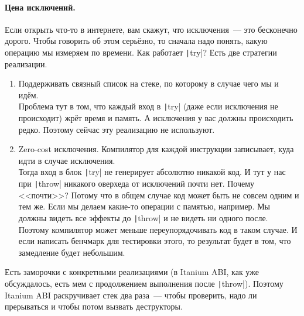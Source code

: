 \documentclass{article}
\begin{document}
    \paragraph{Цена исключений.}
    Если открыть что-то в интернете, вам скажут, что исключения~--- это бесконечно дорого. Чтобы говорить об этом серьёзно, то сначала надо понять, какую операцию мы измеряем по времени. Как работает \texttt|try|? Есть две стратегии реализации.
    \begin{enumerate}
        \item Поддерживать связный список на стеке, по которому в случае чего мы и идём.\\
        Проблема тут в том, что каждый вход в \texttt|try| (даже если исключения не происходит) жрёт время и память. А исключения у вас должны происходить редко. Поэтому сейчас эту реализацию не используют.
        \item Zero-cost исключения. Компилятор для каждой инструкции записывает, куда идти в случае исключения.\\
        Тогда вход в блок \texttt|try| не генерирует абсолютно никакой код. И тут у нас при \texttt|throw| никакого оверхеда от исключений почти нет. Почему <<почти>>? Потому что в общем случае код может быть не совсем одним и тем же. Если мы делаем какие-то операции с памятью, например. Мы должны видеть все эффекты до \texttt|throw| и не видеть ни одного после. Поэтому компилятор может меньше переупорядочивать код в таком случае. И если написать бенчмарк для тестировки этого, то результат будет в том, что замедление будет небольшим.
    \end{enumerate}
    Есть заморочки с конкретными реализациями (в Itanium ABI, как уже обсуждалось, есть мем с продолжением выполнения после \texttt|throw|). Поэтому Itanium ABI раскручивает стек два раза~--- чтобы проверить, надо ли прерываться и чтобы потом вызвать деструкторы.
\end{document}
